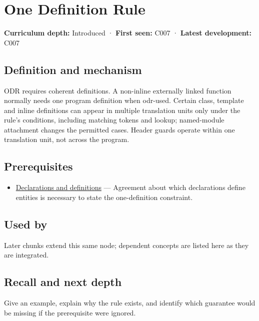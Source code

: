 \hypertarget{appendix-49d27bc9d9a5}{}\label{referencestart:appendix-49d27bc9d9a5}
\section{One Definition Rule}\label{appendix-49d27bc9d9a5-one-definition-rule}

\textbf{Curriculum depth:} Introduced · \textbf{First seen:} C007 · \textbf{Latest development:} C007

\subsection{Definition and mechanism}\label{appendix-49d27bc9d9a5-definition-and-mechanism}

ODR requires coherent definitions. A non-inline externally linked function normally needs one program definition when odr-used. Certain class, template and inline definitions can appear in multiple translation units only under the rule's conditions, including matching tokens and lookup; named-module attachment changes the permitted cases. Header guards operate within one translation unit, not across the program.

\subsection{Prerequisites}\label{appendix-49d27bc9d9a5-prerequisites}

\begin{itemize}
\tightlist
\item
  \hyperref[appendix-2e4d494c2d94]{Declarations and definitions} --- Agreement about which declarations define entities is necessary to state the one-definition constraint.
\end{itemize}

\subsection{Used by}\label{appendix-49d27bc9d9a5-used-by}

Later chunks extend this same node; dependent concepts are listed here as they are integrated.

\subsection{Recall and next depth}\label{appendix-49d27bc9d9a5-recall-and-next-depth}

Give an example, explain why the rule exists, and identify which guarantee would be missing if the prerequisite were ignored.

